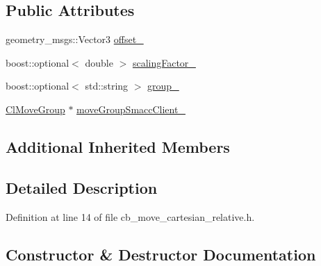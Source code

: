 \subsection*{Public Attributes}
\begin{DoxyCompactItemize}
\item 
geometry\+\_\+msgs\+::\+Vector3 \hyperlink{classcl__move__group__interface_1_1CbMoveCartesianRelative_aac5b6c2f42406da43f94cd5334aca925}{offset\+\_\+}
\item 
boost\+::optional$<$ double $>$ \hyperlink{classcl__move__group__interface_1_1CbMoveCartesianRelative_a2b5e5f05bce94dd3078abfd306c6ef39}{scaling\+Factor\+\_\+}
\item 
boost\+::optional$<$ std\+::string $>$ \hyperlink{classcl__move__group__interface_1_1CbMoveCartesianRelative_a194d8357267ccd5ee0a10200f1c4cae0}{group\+\_\+}
\item 
\hyperlink{classcl__move__group__interface_1_1ClMoveGroup}{Cl\+Move\+Group} $\ast$ \hyperlink{classcl__move__group__interface_1_1CbMoveCartesianRelative_ac0226b2db9bf4de86eb64a535457e295}{move\+Group\+Smacc\+Client\+\_\+}
\end{DoxyCompactItemize}
\subsection*{Additional Inherited Members}


\subsection{Detailed Description}


Definition at line 14 of file cb\+\_\+move\+\_\+cartesian\+\_\+relative.\+h.



\subsection{Constructor \& Destructor Documentation}
\mbox{\label{classcl__move__group__interface_1_1CbMoveCartesianRelative_a1e9c37f096a7f7cb2973cf739c967f36}} 
